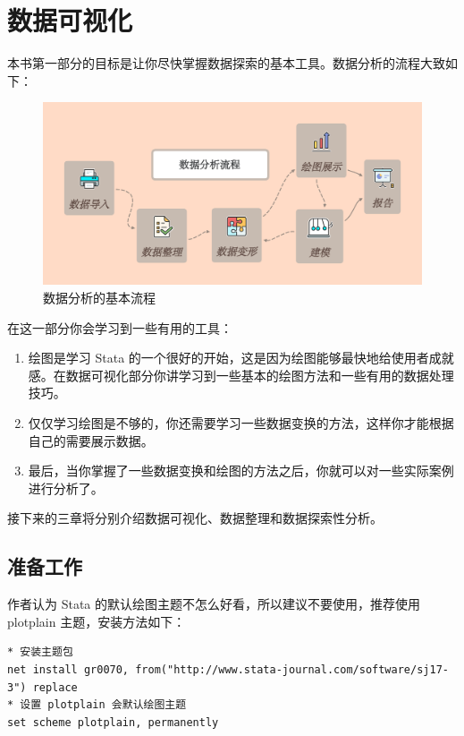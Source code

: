 \chapter{数据可视化}

本书第一部分的目标是让你尽快掌握数据探索的基本工具。数据分析的流程大致如下：

\begin{figure}[htbp]
  \centering
  \includegraphics[width=\textwidth]{assets/数据分析流程.png}
  \caption{数据分析的基本流程}\label{fig:datawf}
\end{figure}

在这一部分你会学习到一些有用的工具：

\begin{enumerate}
\item  绘图是学习 Stata 的一个很好的开始，这是因为绘图能够最快地给使用者成就感。在数据可视化部分你讲学习到一些基本的绘图方法和一些有用的数据处理技巧。
\item  仅仅学习绘图是不够的，你还需要学习一些数据变换的方法，这样你才能根据自己的需要展示数据。
\item  最后，当你掌握了一些数据变换和绘图的方法之后，你就可以对一些实际案例进行分析了。
\end{enumerate}

接下来的三章将分别介绍数据可视化、数据整理和数据探索性分析。

\section{准备工作}

作者认为 Stata 的默认绘图主题不怎么好看，所以建议不要使用，推荐使用 plotplain 主题，安装方法如下：

\begin{lstlisting}
* 安装主题包
net install gr0070, from("http://www.stata-journal.com/software/sj17-3") replace
* 设置 plotplain 会默认绘图主题
set scheme plotplain, permanently
\end{lstlisting}

